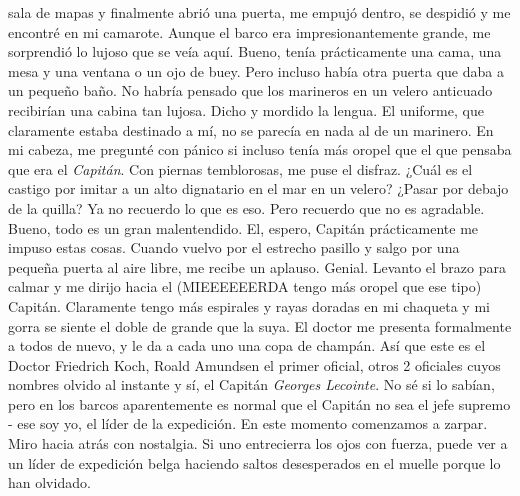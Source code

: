 \documentclass{article}
\begin{document}
    sala de mapas y finalmente abrió una puerta, me empujó dentro, se despidió y me encontré en mi camarote. Aunque
    el
    barco era impresionantemente grande, me sorprendió lo lujoso que se veía aquí. Bueno, tenía prácticamente una
    cama, una mesa y una ventana o un ojo de buey. Pero incluso había otra puerta que daba a un pequeño baño. No
    habría pensado que los marineros en un velero anticuado recibirían una cabina tan lujosa. Dicho y mordido la
    lengua. El uniforme, que claramente estaba destinado a mí, no se parecía en nada al de un marinero. En mi
    cabeza,
    me pregunté con pánico si incluso tenía más oropel que el que pensaba que era el \textit{Capitán}. Con piernas
    temblorosas, me puse el disfraz. ¿Cuál es el castigo por imitar a un alto dignatario en el mar en un velero?
    ¿Pasar por debajo de la quilla? Ya no recuerdo lo que es eso. Pero recuerdo que no es agradable. Bueno, todo es
    un
    gran malentendido. El, espero, Capitán prácticamente me impuso estas cosas. Cuando vuelvo por el estrecho
    pasillo
    y salgo por una pequeña puerta al aire libre, me recibe un aplauso. Genial. Levanto el brazo para calmar y me
    dirijo hacia el (MIEEEEEERDA tengo más oropel que ese tipo) Capitán. Claramente tengo más espirales y rayas
    doradas en mi chaqueta y mi gorra se siente el doble de grande que la suya. El doctor me presenta formalmente a
    todos de nuevo, y le da a cada uno una copa de champán. Así que este es el Doctor Friedrich Koch, Roald Amundsen
    el primer oficial, otros 2 oficiales cuyos nombres olvido al instante y sí, el Capitán \textit{Georges Lecointe}.
    No
    sé si lo sabían, pero en los barcos aparentemente es normal que el Capitán no sea el jefe supremo - ese soy yo,
    el
    líder de la expedición. En este momento comenzamos a zarpar. Miro hacia atrás con nostalgia. Si uno entrecierra
    los ojos con fuerza, puede ver a un líder de expedición belga haciendo saltos desesperados en el muelle porque
    lo
    han olvidado.\\
\end{document}
